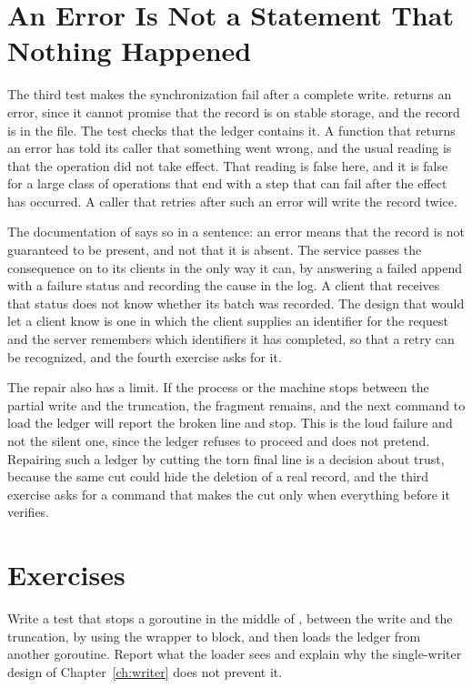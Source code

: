 \section{An Error Is Not a Statement That Nothing Happened}

The third test makes the synchronization fail after a complete write.  returns an error, since it cannot promise that the record is on stable storage, and the record is in the file. The test checks that the ledger contains it. A function that returns an error has told its caller that something went wrong, and the usual reading is that the operation did not take effect. That reading is false here, and it is false for a large class of operations that end with a step that can fail after the effect has occurred. A caller that retries after such an error will write the record twice.

The documentation of  says so in a sentence: an error means that the record is not guaranteed to be present, and not that it is absent. The service passes the consequence on to its clients in the only way it can, by answering a failed append with a failure status and recording the cause in the log. A client that receives that status does not know whether its batch was recorded. The design that would let a client know is one in which the client supplies an identifier for the request and the server remembers which identifiers it has completed, so that a retry can be recognized, and the fourth exercise asks for it.

The repair also has a limit. If the process or the machine stops between the partial write and the truncation, the fragment remains, and the next command to load the ledger will report the broken line and stop. This is the loud failure and not the silent one, since the ledger refuses to proceed and does not pretend. Repairing such a ledger by cutting the torn final line is a decision about trust, because the same cut could hide the deletion of a real record, and the third exercise asks for a command that makes the cut only when everything before it verifies.

\section*{Exercises}

\begin{exercise}
Write a test that stops a goroutine in the middle of , between the write and the truncation, by using the wrapper to block, and then loads the ledger from another goroutine. Report what the loader sees and explain why the single-writer design of Chapter~\ref{ch:writer} does not prevent it.
\end{exercise}

